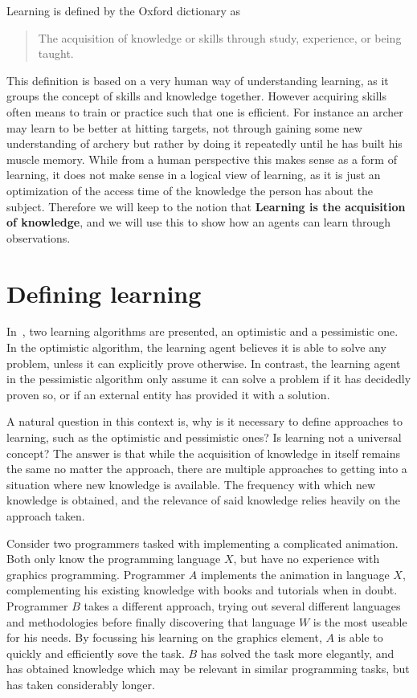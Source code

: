 \documentclass[../Master.tex]{subfiles}
\begin{document}
	
	Learning is defined by the Oxford dictionary as 
	\begin{quote}
		The acquisition of knowledge or skills through study, experience, or being taught.
	\end{quote}
	
	This definition is based on a very human way of understanding learning, as it groups the concept of skills and knowledge together.
	However acquiring skills often means to train or practice such that one is efficient. For instance an archer may learn to be better at hitting targets, 
	not through gaining some new understanding of archery but rather by doing it repeatedly until he has built his muscle memory.
	While from a human perspective this makes sense as a form of learning, 
	it does not make sense in a logical view of learning, as it is just an optimization of the access time of the knowledge the person has about the subject.
	Therefore we will keep to the notion that \textbf{Learning is the acquisition of knowledge}, and we will use this to show how an agents can learn through observations.
	
\section{Defining learning}
	
	In~\cite{Walsh2008}, two learning algorithms are presented, an optimistic and a pessimistic one.
    In the optimistic algorithm, the learning agent believes it is able to solve any problem, unless it can explicitly prove otherwise. In contrast, the learning agent in the pessimistic algorithm only assume it can solve a problem if it has decidedly proven so, or if an external entity has provided it with a solution. 

A natural question in this context is, why is it necessary to define approaches to learning, such as the optimistic and pessimistic ones? Is learning not a universal concept? The answer is that while the acquisition of knowledge in itself remains the same no matter the approach, there are multiple approaches to getting into a situation where new knowledge is available. The frequency with which new knowledge is obtained, and the relevance of said knowledge relies heavily on the approach taken.

\begin{example}
    Consider two programmers tasked with implementing a complicated animation. Both only know the programming language $X$, but have no experience with graphics programming. Programmer $A$ implements the animation in language $X$, complementing his existing knowledge with books and tutorials when in doubt. Programmer $B$ takes a different approach, trying out several different languages and methodologies before finally discovering that language $W$ is the most useable for his needs. By focussing his learning on the graphics element, $A$ is able to quickly and efficiently sove the task. $B$ has solved the task more elegantly, and has obtained knowledge which may be relevant in similar programming tasks, but has taken considerably longer.
\end{example}
\end{document}
